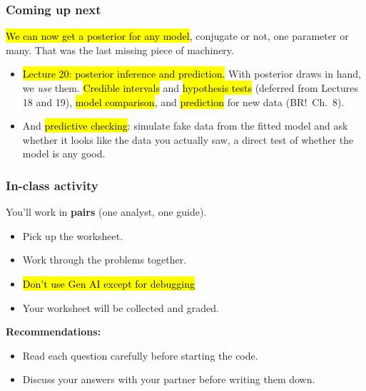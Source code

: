 \documentclass[slidestop,compress,mathserif]{beamer}
\begin{document}
\begin{frame}
\frametitle{Coming up next}

\hl{We can now get a posterior for any model}, conjugate or not, one parameter or many. That was the last missing piece of machinery.

\vspace{0.4em}
\begin{itemize}
\item \hl{Lecture 20: posterior inference and prediction.} With posterior draws in hand, we \emph{use} them. \hl{Credible intervals} and \hl{hypothesis tests} (deferred from Lectures 18 and 19), \hl{model comparison}, and \hl{prediction} for new data (BR!\ Ch.\ 8).
\pause
\item And \hl{predictive checking}: simulate fake data from the fitted model and ask whether it looks like the data you actually saw, a direct test of whether the model is any good.
\end{itemize}

\end{frame}

\begin{frame}
\frametitle{In-class activity}

You'll work in \textbf{pairs} (one analyst, one guide).

\medskip
\begin{itemize}
\item Pick up the worksheet.
\item Work through the problems together.
\item \hl{Don't use Gen AI except for debugging}
\item Your worksheet will be collected and graded.
\end{itemize}

\medskip
\textbf{Recommendations:}
\begin{itemize}
\item Read each question carefully before starting the code.
\item Discuss your answers with your partner before writing them down.
\end{itemize}

\end{frame}
\end{document}
